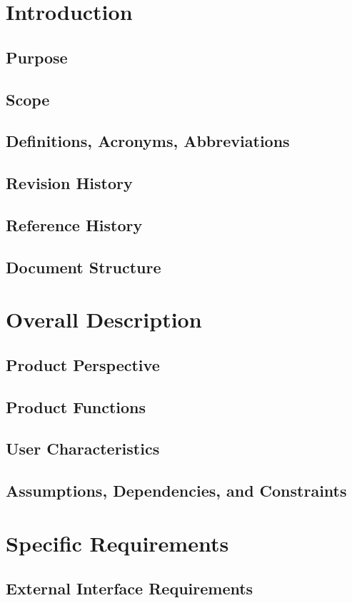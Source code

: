 \documentclass[a4paper]{article}
\begin{document}
\tableofcontents

\section{Introduction}
\subsection{Purpose}
\subsection{Scope}
\subsection{Definitions, Acronyms, Abbreviations}
\subsection{Revision History}
\subsection{Reference History}
\subsection{Document Structure}
\section{Overall Description}
\subsection{Product Perspective}
\subsection{Product Functions}
\subsection{User Characteristics}
\subsection{Assumptions, Dependencies, and Constraints}
\section{Specific Requirements}
\subsection{External Interface Requirements}
\end{document}
